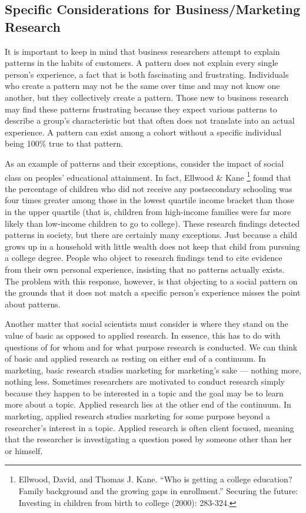 \documentclass[]{book}
\let\rmarkdownfootnote\footnote%
\def\footnote{\protect\rmarkdownfootnote}
\theoremstyle{definition}
\theoremstyle{definition}
\theoremstyle{definition}
\theoremstyle{remark}
\begin{document}
\hypertarget{specific-considerations-for-businessmarketing-research}{%
\subsection{Specific Considerations for Business/Marketing
Research}\label{specific-considerations-for-businessmarketing-research}}

It is important to keep in mind that business researchers attempt to
explain patterns in the habits of customers. A pattern does not explain
every single person's experience, a fact that is both fascinating and
frustrating. Individuals who create a pattern may not be the same over
time and may not know one another, but they collectively create a
pattern. Those new to business research may find these patterns
frustrating because they expect various patterns to describe a group's
characteristic but that often does not translate into an actual
experience. A pattern can exist among a cohort without a specific
individual being 100\% true to that pattern.

As an example of patterns and their exceptions, consider the impact of
social class on peoples' educational attainment. In fact, Ellwood \&
Kane \footnote{Ellwood, David, and Thomas J. Kane. ``Who is getting a
  college education? Family background and the growing gaps in
  enrollment.'' Securing the future: Investing in children from birth to
  college (2000): 283-324.} found that the percentage of children who
did not receive any postsecondary schooling was four times greater among
those in the lowest quartile income bracket than those in the upper
quartile (that is, children from high-income families were far more
likely than low-income children to go to college). These research
findings detected patterns in society, but there are certainly many
exceptions. Just because a child grows up in a household with little
wealth does not keep that child from pursuing a college degree. People
who object to research findings tend to cite evidence from their own
personal experience, insisting that no patterns actually exists. The
problem with this response, however, is that objecting to a social
pattern on the grounds that it does not match a specific person's
experience misses the point about patterns.

Another matter that social scientists must consider is where they stand
on the value of basic as opposed to applied research. In essence, this
has to do with questions of for whom and for what purpose research is
conducted. We can think of basic and applied research as resting on
either end of a continuum. In marketing, basic research studies
marketing for marketing's sake --- nothing more, nothing less. Sometimes
researchers are motivated to conduct research simply because they happen
to be interested in a topic and the goal may be to learn more about a
topic. Applied research lies at the other end of the continuum. In
marketing, applied research studies marketing for some purpose beyond a
researcher's interest in a topic. Applied research is often client
focused, meaning that the researcher is investigating a question posed
by someone other than her or himself.
\end{document}
